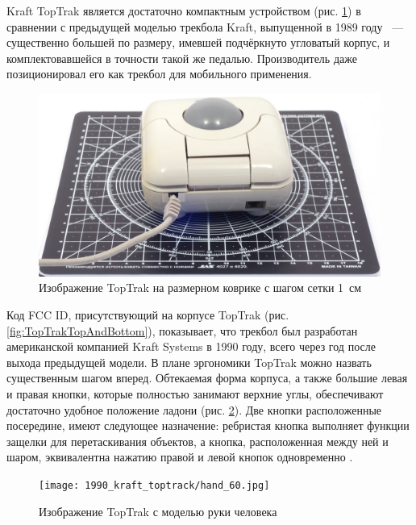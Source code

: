 \documentclass[11pt, a4paper]{article}
\begin{document}
Kraft TopTrak является достаточно компактным устройством (рис. \ref{fig:TopTrakSize}) в сравнении с предыдущей моделью трекбола Kraft, выпущенной в 1989 году ~--- существенно большей по размеру, имевшей подчёркнуто угловатый корпус, и комплектовавшейся в точности такой же педалью. Производитель даже позиционировал его как трекбол для мобильного применения.

\begin{figure}[h]
    \centering
    \includegraphics[scale=0.35]{1990_kraft_toptrack/2.6_30.jpg}
    \caption{Изображение TopTrak на размерном коврике с шагом сетки 1~см}
    \label{fig:TopTrakSize}
\end{figure}


Код FCC ID, присутствующий на корпусе TopTrak (рис. \ref{fig:TopTrakTopAndBottom}), показывает, что трекбол был разработан американской компанией Kraft Systems в 1990 году, всего через год после выхода предыдущей модели.
В плане эргономики TopTrak можно назвать существенным шагом вперед. Обтекаемая форма корпуса, а также большие левая и правая кнопки, которые полностью занимают верхние углы, обеспечивают достаточно удобное положение ладони (рис. \ref{fig:TopTrakHand}).
Две кнопки расположенные посередине, имеют следующее назначение: ребристая кнопка выполняет функции защелки для перетаскивания объектов, а кнопка, расположенная между ней и шаром, эквивалентна нажатию правой и левой кнопок одновременно \cite{mouses}.

\begin{figure}[h]
    \centering
    \texttt{[image: 1990\_kraft\_toptrack/hand\_60.jpg]}
    \caption{Изображение TopTrak с моделью руки человека}
    \label{fig:TopTrakHand}
\end{figure}


\end{document}
